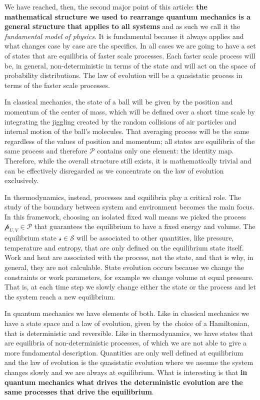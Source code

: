\documentclass[applsci,article,submit,moreauthors,pdftex]{Definitions/mdpi}
\begin{document}
We have reached, then, the second major point of this article: \textbf{the mathematical structure we used to rearrange quantum mechanics is a general structure that applies to all systems} and as such we call it the \emph{fundamental model of physics}. It is fundamental because it always applies and what changes case by case are the specifics. In all cases we are going to have a set of states that are equilibria of faster scale processes. Each faster scale process will be, in general, non-deterministic in terms of the state and will act on the space of probability distributions. The law of evolution will be a quasistatic process in terms of the faster scale processes.

In classical mechanics, the state of a ball will be given by the position and momentum of the center of mass, which will be defined over a short time scale by integrating the jiggling created by the random collisions of air particles and internal motion of the ball's molecules. That averaging process will be the same regardless of the values of position and momentum; all states are equilibria of the same process and therefore $\mathcal{P}$ contains only one element: the identity map. Therefore, while the overall structure still exists, it is mathematically trivial and can be effectively disregarded as we concentrate on the law of evolution exclusively.

In thermodynamics, instead, processes and equilibria play a critical role. The study of the boundary between system and environment becomes the main focus. In this framework, choosing an isolated fixed wall means we picked the process $\mathcal{p}_{U,V} \in \mathcal{P}$ that guarantees the equilibrium to have a fixed energy and volume. The equilibrium state $\mathcal{s} \in \mathcal{S}$ will be associated to other quantities, like pressure, temperature and entropy, that are only defined on the equilibrium state itself. Work and heat are associated with the process, not the state, and that is why, in general, they are not calculable. State evolution occurs because we change the constraints or work parameters, for example we change volume at equal pressure. That is, at each time step we slowly change either the state or the process and let the system reach a new equilibrium.

In quantum mechanics we have elements of both. Like in classical mechanics we have a state space and a law of evolution, given by the choice of a Hamiltonian, that is deterministic and reversible. Like in thermodynamics, we have states that are equilibria of non-deterministic processes, of which we are not able to give a more fundamental description. Quantities are only well defined at equilibrium and the law of evolution is the quasistatic evolution where we assume the system changes slowly and we are always at equilibrium. What is interesting is that \textbf{in quantum mechanics what drives the deterministic evolution are the same processes that drive the equilibrium}.
\end{document}
